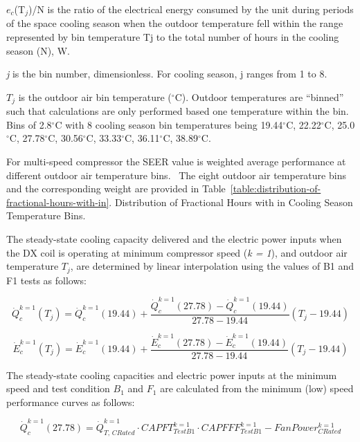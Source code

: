 \(e_{c}\)(T\(_{j}\))/N is the ratio of the electrical energy consumed by the unit during periods of the space cooling season when the outdoor temperature fell within the range represented by bin temperature Tj to the total number of hours in the cooling season (N), W.

\emph{j} is the bin number, dimensionless. For cooling season, j ranges from 1 to 8.

\(T_{j}\) is the outdoor air bin temperature (\(^{\circ}\)C). Outdoor temperatures are ``binned'' such that calculations are only performed based one temperature within the bin. Bins of 2.8\(^{\circ}\)C with 8 cooling season bin temperatures being 19.44\(^{\circ}\)C, 22.22\(^{\circ}\)C, 25.0\(^{\circ}\)C, 27.78\(^{\circ}\)C, 30.56\(^{\circ}\)C, 33.33\(^{\circ}\)C, 36.11\(^{\circ}\)C, 38.89\(^{\circ}\)C.

For multi-speed compressor the SEER value is weighted average performance at different outdoor air temperature bins.~ The eight outdoor air temperature bins and the corresponding weight are provided in Table~\ref{table:distribution-of-fractional-hours-with-in}. Distribution of Fractional Hours with in Cooling Season Temperature Bins.

The steady-state cooling capacity delivered and the electric power inputs when the DX coil is operating at minimum compressor speed (\emph{k = 1}), and outdoor air temperature \(T_{j}\), are determined by linear interpolation using the values of B1 and F1 tests as follows:

\begin{equation}
\dot Q_c^{k = 1}({T_j}) = \dot Q_c^{k = 1}(19.44) + \frac{{\dot Q_c^{k = 1}(27.78) - \dot Q_c^{k = 1}(19.44)}}{{27.78 - 19.44}}\left( {{T_j} - 19.44} \right)
\end{equation}

\begin{equation}
\dot E_c^{k = 1}({T_j}) = \dot E_c^{k = 1}(19.44) + \frac{{\dot E_c^{k = 1}(27.78) - \dot E_c^{k = 1}(19.44)}}{{27.78 - 19.44}}\left( {{T_j} - 19.44} \right)
\end{equation}

The steady-state cooling capacities and electric power inputs at the minimum speed and test condition \(B_{1}\) and \(F_{1}\) are calculated from the minimum (low) speed performance curves as follows:

\begin{equation}
\dot Q_c^{k = 1}(27.78) = \dot Q_{T,\,CRated}^{k = 1} \cdot CAPFT_{TestB1}^{k = 1} \cdot CAPFFF_{TestB1}^{k = 1} - FanPower_{CRated}^{k = 1}
\end{equation}

